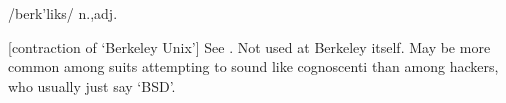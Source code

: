  /berk'liks/ n.,adj.

[contraction of `Berkeley Unix'] See . Not used at Berkeley
itself. May be more common among suits attempting to sound like cognoscenti than
among hackers, who usually just say `BSD'.

